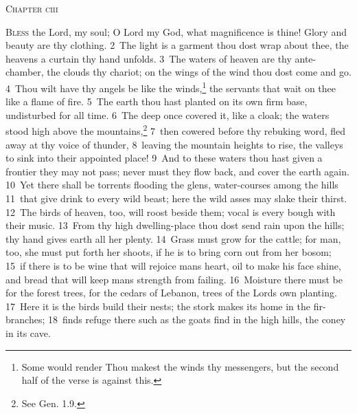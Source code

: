 \documentclass[10pt]{book} %
\begin{document}
\begin{large}\begin{center}\textsc{Chapter ciii}\end{center}\end{large}
\lettrine[lines=2]{B}{less} the Lord, my soul; O Lord my God, what magnificence is thine! Glory and beauty are thy clothing. \textcolor{benred8}{2}~The light is a garment thou dost wrap about thee, the heavens a curtain thy hand unfolds. \textcolor{benred8}{3}~The waters of heaven are thy ante-chamber, the clouds thy chariot; on the wings of the wind thou dost come and go. \textcolor{benred8}{4}~Thou wilt have thy angels be like the winds,\footnote[1]{Some would render \textasciigrave Thou makest the winds thy messengers\textquotesingle , but the second half of the verse is against this.} the servants that wait on thee like a flame of fire.
\textcolor{benred8}{5}~The earth thou hast planted on its own firm base, undisturbed for all time. \textcolor{benred8}{6}~The deep once covered it, like a cloak; the waters stood high above the mountains,\footnote[2]{See Gen. 1.9.} \textcolor{benred8}{7}~then cowered before thy rebuking word, fled away at thy voice of thunder, \textcolor{benred8}{8}~leaving the mountain heights to rise, the valleys to sink into their appointed place! \textcolor{benred8}{9}~And to these waters thou hast given a frontier they may not pass; never must they flow back, and cover the earth again. \textcolor{benred8}{10}~Yet there shall be torrents flooding the glens, water-courses among the hills \textcolor{benred8}{11}~that give drink to every wild beast; here the wild asses may slake their thirst. \textcolor{benred8}{12}~The birds of heaven, too, will roost beside them; vocal is every bough with their music.
\textcolor{benred8}{13}~From thy high dwelling-place thou dost send rain upon the hills; thy hand gives earth all her plenty. \textcolor{benred8}{14}~Grass must grow for the cattle; for man, too, she must put forth her shoots, if he is to bring corn out from her bosom; \textcolor{benred8}{15}~if there is to be wine that will rejoice man\textquotesingle s heart, oil to make his face shine, and bread that will keep man\textquotesingle s strength from failing. \textcolor{benred8}{16}~Moisture there must be for the forest trees, for the cedars of Lebanon, trees of the Lord\textquotesingle s own planting. \textcolor{benred8}{17}~Here it is the birds build their nests; the stork makes its home in the fir-branches; \textcolor{benred8}{18}~finds refuge there such as the goats find in the high hills, the coney in its cave.
\end{document}
